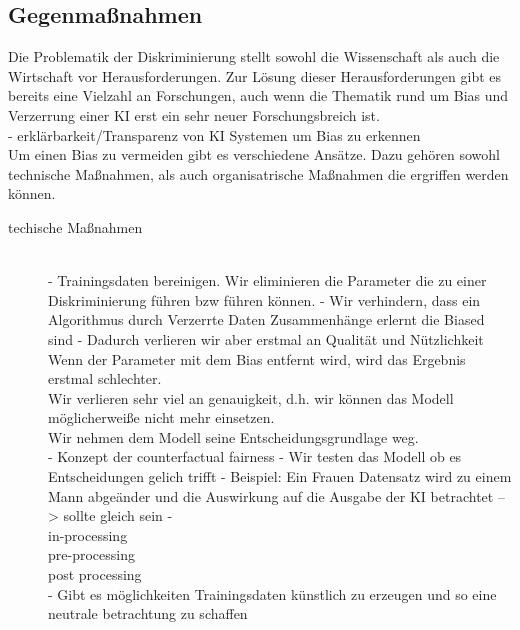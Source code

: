 \begin{onehalfspace}
    \subsection{Gegenma{\ss}nahmen}
    \label{subsubsec:gegenmassnahmen}
        Die Problematik der Diskriminierung stellt sowohl die Wissenschaft als auch die Wirtschaft vor Herausforderungen. Zur Lösung dieser Herausforderungen gibt es bereits eine Vielzahl an Forschungen, auch wenn die Thematik rund um Bias und Verzerrung einer \ac*{KI} erst ein sehr neuer Forschungsbreich ist.
        \\
        - erklärbarkeit/Transparenz von \ac*{KI} Systemen um Bias zu erkennen
        \\
        Um einen Bias zu vermeiden gibt es verschiedene Ansätze. Dazu gehören sowohl technische Maßnahmen, als auch organisatrische Maßnahmen die ergriffen werden können. 
        \begin{description}
            \item[techische Maßnahmen] \hfill \\
            - Trainingsdaten bereinigen. Wir eliminieren die Parameter die zu einer Diskriminierung führen bzw führen können.
            - Wir verhindern, dass ein Algorithmus  durch Verzerrte Daten Zusammenhänge erlernt die Biased sind
            - Dadurch verlieren wir aber erstmal an Qualität und Nützlichkeit
            Wenn der Parameter mit dem Bias entfernt wird, wird das Ergebnis erstmal schlechter. \\
            Wir verlieren sehr viel an genauigkeit, d.h. wir können das Modell möglicherweiße nicht mehr einsetzen.\\
            Wir nehmen dem Modell seine Entscheidungsgrundlage weg.
            \cite{hagendorff2019maschinelles}
            \\
            - Konzept der \glqq{}counterfactual fairness\grqq{} 
            - Wir testen das Modell ob es Entscheidungen gelich trifft
            - Beispiel: Ein Frauen Datensatz wird zu einem Mann abgeänder und die Auswirkung auf die Ausgabe der KI betrachtet --> sollte gleich sein
            - \cite{hagendorff2019maschinelles}
            \\
            in-processing
            \\
            pre-processing
            \\
            post processing
            \\
            - Gibt es möglichkeiten Trainingsdaten künstlich zu erzeugen und so eine neutrale betrachtung zu schaffen

\end{description}
\end{onehalfspace}
